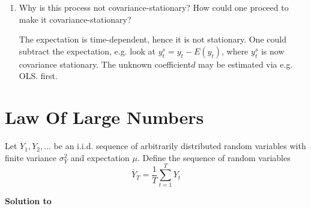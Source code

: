 \documentclass[a4paper]{scrartcl}
\begin{document}
\begin{enumerate}
\begin{solution}
                  
              \end{solution}
        \item Why is this process not covariance-stationary? How could one proceed to make it covariance-stationary?
              \begin{solution}
                  The expectation is time-dependent, hence it is not stationary. One could subtract the expectation, e.g. look at $y_{t}^{s} = y_{t} -E(y_t)$, where $y_t^s$ is now covariance stationary. The unknown coefficient$d$ may be estimated via e.g. OLS. first.
                  \newpage %
              \end{solution}
    \end{enumerate}
    
    \newpage
    
    \section[Law Of Large Numbers]{Law Of Large Numbers}\label{ex:LLN}
    Let $Y_{1},Y_{2},\ldots $ be an i.i.d. sequence of arbitrarily distributed random variables with finite variance $\sigma_Y ^{2}$ and expectation $\mu$. Define the sequence of
    random variables
    \begin{equation*}
        \overline{Y}_{T}=\frac{1}{T}\sum_{t=1}^{T}Y_{t}
    \end{equation*}
    \begin{solution}\textbf{Solution to }\end{solution}
\end{document}
